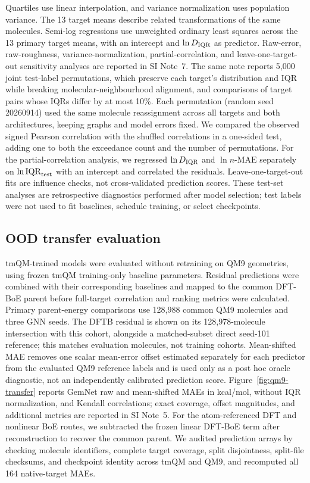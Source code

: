 Quartiles use linear interpolation, and variance normalization uses population variance. The 13 target means describe related transformations of the same molecules. Semi-log regressions use unweighted ordinary least squares across the 13 primary target means, with an intercept and \(\ln D_{\rm IQR}\) as predictor. Raw-error, raw-roughness, variance-normalization, partial-correlation, and leave-one-target-out sensitivity analyses are reported in SI Note~7. The same note reports 5,000 joint test-label permutations, which preserve each target's distribution and IQR while breaking molecular-neighbourhood alignment, and comparisons of target pairs whose IQRs differ by at most 10\%. Each permutation (random seed 20260914) used the same molecule reassignment across all targets and both architectures, keeping graphs and model errors fixed. We compared the observed signed Pearson correlation with the shuffled correlations in a one-sided test, adding one to both the exceedance count and the number of permutations. For the partial-correlation analysis, we regressed \(\ln D_{\rm IQR}\) and \(\ln n\text{-MAE}\) separately on \(\ln \mathrm{IQR}_{\rm test}\) with an intercept and correlated the residuals. Leave-one-target-out fits are influence checks, not cross-validated prediction scores. These test-set analyses are retrospective diagnostics performed after model selection; test labels were not used to fit baselines, schedule training, or select checkpoints.

\subsection{OOD transfer evaluation}
\label{sec:methods-transfer}

tmQM-trained models were evaluated without retraining on QM9 geometries, using frozen tmQM training-only baseline parameters. Residual predictions were combined with their corresponding baselines and mapped to the common DFT-BoE parent before full-target correlation and ranking metrics were calculated. Primary parent-energy comparisons use 128,988 common QM9 molecules and three GNN seeds. The DFTB residual is shown on its 128,978-molecule intersection with this cohort, alongside a matched-subset direct seed-101 reference; this matches evaluation molecules, not training cohorts. Mean-shifted MAE removes one scalar mean-error offset estimated separately for each predictor from the evaluated QM9 reference labels and is used only as a post hoc oracle diagnostic, not an independently calibrated prediction score. Figure~\ref{fig:qm9-transfer} reports GemNet raw and mean-shifted MAEs in kcal/mol, without IQR normalization, and Kendall correlations; exact coverage, offset magnitudes, and additional metrics are reported in SI Note~5. For the atom-referenced DFT and nonlinear BoE routes, we subtracted the frozen linear DFT-BoE term after reconstruction to recover the common parent. We audited prediction arrays by checking molecule identifiers, complete target coverage, split disjointness, split-file checksums, and checkpoint identity across tmQM and QM9, and recomputed all 164 native-target MAEs.
